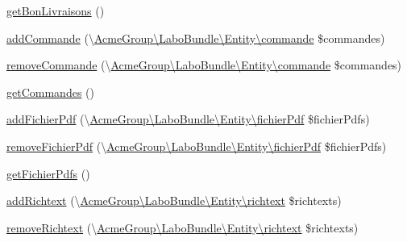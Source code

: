 \begin{DoxyCompactItemize}
\hyperlink{class_acme_group_1_1_user_bundle_1_1_entity_1_1_user_a3313dd86a9a9b7c19d44786f7e4a1d9d}{get\+Bon\+Livraisons} ()
\item 
\hyperlink{class_acme_group_1_1_user_bundle_1_1_entity_1_1_user_aca02e3c12b8d40e9e792cb46cd90bd7d}{add\+Commande} (\textbackslash{}\hyperlink{class_acme_group_1_1_labo_bundle_1_1_entity_1_1commande}{Acme\+Group\textbackslash{}\+Labo\+Bundle\textbackslash{}\+Entity\textbackslash{}commande} \$commandes)
\item 
\hyperlink{class_acme_group_1_1_user_bundle_1_1_entity_1_1_user_a51420a1d1257e219774490d48ff8d4f9}{remove\+Commande} (\textbackslash{}\hyperlink{class_acme_group_1_1_labo_bundle_1_1_entity_1_1commande}{Acme\+Group\textbackslash{}\+Labo\+Bundle\textbackslash{}\+Entity\textbackslash{}commande} \$commandes)
\item 
\hyperlink{class_acme_group_1_1_user_bundle_1_1_entity_1_1_user_ab51e44a36c3d0f7fe2e3e4947994e422}{get\+Commandes} ()
\item 
\hyperlink{class_acme_group_1_1_user_bundle_1_1_entity_1_1_user_a507406ecc12fdc003e8729c65f3ec732}{add\+Fichier\+Pdf} (\textbackslash{}\hyperlink{class_acme_group_1_1_labo_bundle_1_1_entity_1_1fichier_pdf}{Acme\+Group\textbackslash{}\+Labo\+Bundle\textbackslash{}\+Entity\textbackslash{}fichier\+Pdf} \$fichier\+Pdfs)
\item 
\hyperlink{class_acme_group_1_1_user_bundle_1_1_entity_1_1_user_a1f42f8b11d24d0007d5e5a8bc753d14d}{remove\+Fichier\+Pdf} (\textbackslash{}\hyperlink{class_acme_group_1_1_labo_bundle_1_1_entity_1_1fichier_pdf}{Acme\+Group\textbackslash{}\+Labo\+Bundle\textbackslash{}\+Entity\textbackslash{}fichier\+Pdf} \$fichier\+Pdfs)
\item 
\hyperlink{class_acme_group_1_1_user_bundle_1_1_entity_1_1_user_a5abd1db5d592f12a82e8bf0f551ff8ed}{get\+Fichier\+Pdfs} ()
\item 
\hyperlink{class_acme_group_1_1_user_bundle_1_1_entity_1_1_user_ac146942c870bf76034d0eff6d3a59b24}{add\+Richtext} (\textbackslash{}\hyperlink{class_acme_group_1_1_labo_bundle_1_1_entity_1_1richtext}{Acme\+Group\textbackslash{}\+Labo\+Bundle\textbackslash{}\+Entity\textbackslash{}richtext} \$richtexts)
\item 
\hyperlink{class_acme_group_1_1_user_bundle_1_1_entity_1_1_user_a618b655d48d24713829cf4a414d15ed4}{remove\+Richtext} (\textbackslash{}\hyperlink{class_acme_group_1_1_labo_bundle_1_1_entity_1_1richtext}{Acme\+Group\textbackslash{}\+Labo\+Bundle\textbackslash{}\+Entity\textbackslash{}richtext} \$richtexts)
\item 

\end{DoxyCompactItemize}
